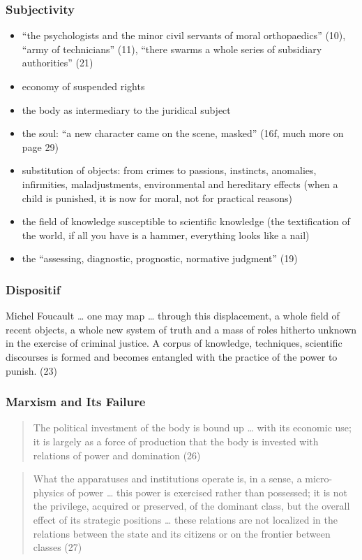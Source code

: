 \documentclass[xcolor=dvipsnames]{beamer}
\begin{document}
\begin{frame}
  \frametitle{Subjectivity}
  \begin{itemize}
  \item ``the psychologists and the minor civil servants of moral
    orthopaedics'' (10), ``army of technicians'' (11), ``there swarms
    a whole series of subsidiary authorities'' (21)
  \item economy of suspended rights
  \item the body as intermediary to the juridical subject
  \item the soul: ``a new character came on the scene, masked'' (16f,
    much more on page 29)
  \item substitution of objects: from crimes to passions, instincts,
    anomalies, infirmities, maladjustments, environmental and
    hereditary effects (when a child is punished, it is now for moral,
    not for practical reasons)
  \item the field of knowledge susceptible to scientific knowledge
    (the textification of the world, if all you have is a hammer,
    everything looks like a nail)
  \item the ``assessing, diagnostic, prognostic, normative judgment''
    (19)
  \end{itemize}
\end{frame}

\begin{frame}
  \frametitle{Dispositif}
  \begin{block}{Michel Foucault}
    {\ldots} one may map {\ldots} through this displacement, a whole
    field of recent objects, a whole new system of truth and a mass of
    roles hitherto unknown in the exercise of criminal justice. A
    corpus of knowledge, techniques, scientific discourses is formed
    and becomes entangled with the practice of the power to punish.
    (23)
  \end{block}
\end{frame}

\begin{frame}
  \frametitle{Marxism and Its Failure}
  \begin{quote}
    The political investment of the body is bound up {\ldots} with its
    economic use; it is largely as a force of production that the body
    is invested with relations of power and domination (26)
  \end{quote}
  \begin{quote}
    What the apparatuses and institutions operate is, in a sense, a
    micro-physics of power {\ldots} this power is exercised rather
    than possessed; it is not the privilege, acquired or preserved, of
    the dominant class, but the overall effect of its strategic
    positions {\ldots} these relations are not localized in the
    relations between the state and its citizens or on the frontier
    between classes (27)
  \end{quote}
\end{frame}
\end{document}
